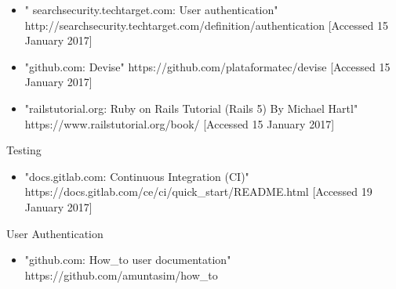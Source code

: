 \documentclass{l3proj}
\begin{document}
\begin{itemize}

\item " searchsecurity.techtarget.com: User authentication"
\newline http://searchsecurity.techtarget.com/definition/authentication [Accessed 15 January 2017]

\item "github.com: Devise"
\newline https://github.com/plataformatec/devise [Accessed 15 January 2017]

\item "railstutorial.org: Ruby on Rails Tutorial (Rails 5) By Michael Hartl"
\newline https://www.railstutorial.org/book/ [Accessed 15 January 2017]

\end{itemize}

\label{testing}

Testing

\begin{itemize}

\item "docs.gitlab.com: Continuous Integration (CI)" 
\newline https://docs.gitlab.com/ce/ci/quick\_start/README.html [Accessed 19 January 2017]

\end{itemize}

\label{authentication}

User Authentication
\begin{itemize}

\item "github.com: How_to user documentation"
\newline https://github.com/amuntasim/how_to


\end{itemize}
\end{document}
